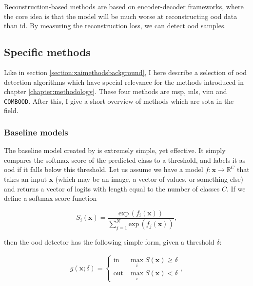\documentclass[UKenglish]{uiomasterthesis} %
\newcommand{\R}{\mathbb{R}}
\theoremstyle{definition}
\begin{document}
Reconstruction-based methods are based on encoder-decoder frameworks, where the core idea is that the model will be much worse at reconstructing \ac{ood} data than \ac{id}. By measuring the reconstruction loss, we can detect \ac{ood} samples.
\\

\subsection{Specific methods} \label{ood_specific}

Like in section \ref{section:xaimethodsbackground}, I here describe a selection of \ac{ood} detection algorithms which have special relevance for the methods introduced in chapter \ref{chapter:methodology}. These four methods are \acf{msp}, \acf{mls}, \acf{vim} and \texttt{COMBOOD}. After this, I give a short overview of methods which are \ac{sota} in the field.

\subsubsection{Baseline models} \label{section:background_baselines}

The baseline model created by \cite{oodbaseline} is extremely simple, yet effective. It simply compares the softmax score of the predicted class to a threshold, and labels it as \ac{ood} if it falls below this threshold. Let us assume we have a model $f: \bm{x} \rightarrow \R^C$ that takes an input $\bm{x}$ (which may be an image, a vector of values, or something else) and returns a vector of logits with length equal to the number of classes $C$. If we define a softmax score function 

\begin{equation}
    S_i(\bm{x}) = \frac{\text{exp} \, (f_i(\bm{x}))}{\sum^N_{j=1} \text{exp} \, (f_j(\bm{x}))},
\label{softmax}
\end{equation}

then the \ac{ood} detector has the following simple form, given a threshold $\delta$:

\begin{align}
\label{eq:msp}
    g(\bm{x}; \delta)=\begin{cases} 
        \text{in } & \max_i S(\bm{x})\ge \delta \\
        \text{out} & \max_i S(\bm{x}) < \delta 
   \end{cases},
\end{align}
\end{document}
